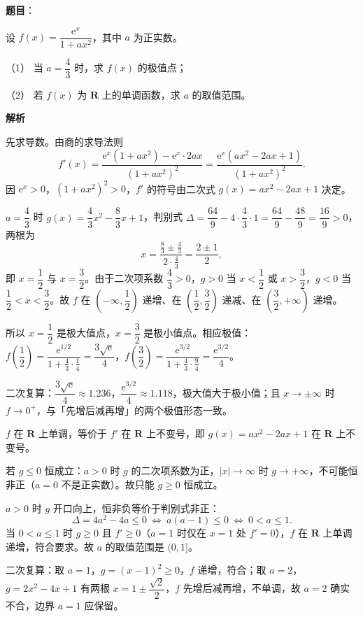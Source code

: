 \begin{answer}

\textbf{题目}：

设 $f(x)=\dfrac{\mathrm e^x}{1+ax^2}$，其中 $a$ 为正实数。

（1） 当 $a=\dfrac43$ 时，求 $f(x)$ 的极值点；

（2） 若 $f(x)$ 为 $\mathbf R$ 上的单调函数，求 $a$ 的取值范围。

\textbf{解析}

先求导数。由商的求导法则
\nopagebreak[4]
\[f'(x)=\frac{\mathrm e^x(1+ax^2)-\mathrm e^x\cdot2ax}{(1+ax^2)^2}=\frac{\mathrm e^x\left(ax^2-2ax+1\right)}{(1+ax^2)^2}.\]
因 $\mathrm e^x>0$，$(1+ax^2)^2>0$，$f'$ 的符号由二次式 $g(x)=ax^2-2ax+1$ 决定。

$a=\dfrac43$ 时 $g(x)=\dfrac43x^2-\dfrac83x+1$，判别式 $\Delta=\dfrac{64}{9}-4\cdot\dfrac43\cdot1=\dfrac{64}{9}-\dfrac{48}{9}=\dfrac{16}{9}>0$，两根为
\nopagebreak[4]
\[x=\frac{\frac83\pm\frac43}{2\cdot\frac43}=\frac{2\pm1}{2},\]
即 $x=\dfrac12$ 与 $x=\dfrac32$。由于二次项系数 $\dfrac43>0$，$g>0$ 当 $x<\dfrac12$ 或 $x>\dfrac32$，$g<0$ 当 $\dfrac12<x<\dfrac32$。故 $f$ 在 $\left(-\infty,\dfrac12\right)$ 递增、在 $\left(\dfrac12,\dfrac32\right)$ 递减、在 $\left(\dfrac32,+\infty\right)$ 递增。

所以 $x=\dfrac12$ 是极大值点，$x=\dfrac32$ 是极小值点。相应极值：$f\left(\dfrac12\right)=\dfrac{\mathrm e^{1/2}}{1+\frac43\cdot\frac14}=\dfrac{3\sqrt{\mathrm e}}{4}$，$f\left(\dfrac32\right)=\dfrac{\mathrm e^{3/2}}{1+\frac43\cdot\frac94}=\dfrac{\mathrm e^{3/2}}{4}$。

二次复算：$\dfrac{3\sqrt{\mathrm e}}{4}\approx1.236$，$\dfrac{\mathrm e^{3/2}}{4}\approx1.118$，极大值大于极小值；且 $x\to\pm\infty$ 时 $f\to0^+$，与「先增后减再增」的两个极值形态一致。

$f$ 在 $\mathbf R$ 上单调，等价于 $f'$ 在 $\mathbf R$ 上不变号，即 $g(x)=ax^2-2ax+1$ 在 $\mathbf R$ 上不变号。

若 $g\leqslant0$ 恒成立：$a>0$ 时 $g$ 的二次项系数为正，$|x|\to\infty$ 时 $g\to+\infty$，不可能恒非正（$a=0$ 不是正实数）。故只能 $g\geqslant0$ 恒成立。

$a>0$ 时 $g$ 开口向上，恒非负等价于判别式非正：
\nopagebreak[4]
\[\Delta=4a^2-4a\leqslant0\ \Longleftrightarrow\ a(a-1)\leqslant0\ \Longleftrightarrow\ 0<a\leqslant1.\]
当 $0<a\leqslant1$ 时 $g\geqslant0$ 且 $f'\geqslant0$（$a=1$ 时仅在 $x=1$ 处 $f'=0$），$f$ 在 $\mathbf R$ 上单调递增，符合要求。故 $a$ 的取值范围是 $(0,1]$。

二次复算：取 $a=1$，$g=(x-1)^2\geqslant0$，$f$ 递增，符合；取 $a=2$，$g=2x^2-4x+1$ 有两根 $x=1\pm\dfrac{\sqrt2}{2}$，$f$ 先增后减再增，不单调，故 $a=2$ 确实不合，边界 $a=1$ 应保留。



\end{answer}
